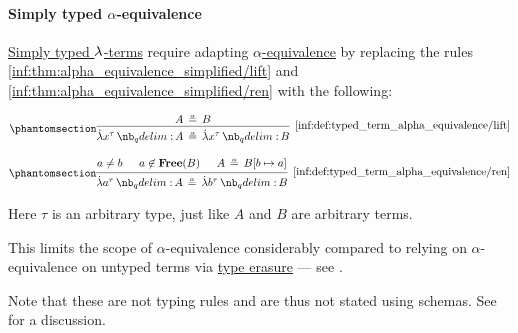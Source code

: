 \paragraph{Simply typed \( \alpha \)-equivalence}

\begin{definition}\label{def:typed_term_alpha_equivalence}
  \hyperref[def:typed_lambda_term]{Simply typed \( {\mathrm \lambda} \)-terms} require adapting \hyperref[def:lambda_term_alpha_equivalence]{\( \alpha \)-equivalence} by replacing the rules \ref{inf:thm:alpha_equivalence_simplified/lift} and \ref{inf:thm:alpha_equivalence_simplified/ren} with the following:
  \begin{paracol}{2}
    \begin{leftcolumn}
      \ParacolAlignmentHack
      \begin{equation*}\taglabel[\ensuremath{ \logic{Lift}_\alpha^{\logic{tt}} }]{inf:def:typed_term_alpha_equivalence/lift}
        \begin{prooftree}
          \hypo{ A \aequiv B }
          \infer1[\ref{inf:def:typed_term_alpha_equivalence/lift}]{ \qabs {x^\tau} A \aequiv \qabs {x^\tau} B }
        \end{prooftree}
      \end{equation*}
    \end{leftcolumn}

    \begin{rightcolumn}
      \ParacolAlignmentHack
      \begin{equation*}\taglabel[\ensuremath{ \logic{Ren}_\alpha^{\logic{tt}} }]{inf:def:typed_term_alpha_equivalence/ren}
        \begin{prooftree}
          \hypo{ a \neq b }
          \hypo{ a \not\in \op*{Free}(B) }
          \hypo{ A \aequiv B[b \mapsto a] }
          \infer3[\ref{inf:def:typed_term_alpha_equivalence/ren}]{ \qabs {a^\tau} A \aequiv \qabs {b^\tau} B }
        \end{prooftree}
      \end{equation*}
    \end{rightcolumn}
  \end{paracol}
\end{definition}
\begin{comments}
  \item Here \( \tau \) is an arbitrary type, just like \( A \) and \( B \) are arbitrary terms.

  \item This limits the scope of \( \alpha \)-equivalence considerably compared to relying on \( \alpha \)-equivalence on untyped terms via \hyperref[alg:type_erasure]{type erasure} --- see .

  \item Note that these are not typing rules and are thus not stated using schemas. See  for a discussion.
\end{comments}

